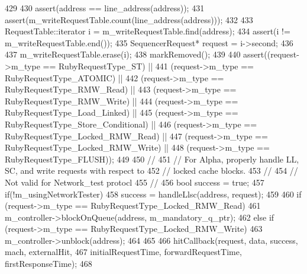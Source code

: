 \begin{DoxyCode}
429 {
430     assert(address == line_address(address));
431     assert(m_writeRequestTable.count(line_address(address)));
432 
433     RequestTable::iterator i = m_writeRequestTable.find(address);
434     assert(i != m_writeRequestTable.end());
435     SequencerRequest* request = i->second;
436 
437     m_writeRequestTable.erase(i);
438     markRemoved();
439 
440     assert((request->m_type == RubyRequestType_ST) ||
441            (request->m_type == RubyRequestType_ATOMIC) ||
442            (request->m_type == RubyRequestType_RMW_Read) ||
443            (request->m_type == RubyRequestType_RMW_Write) ||
444            (request->m_type == RubyRequestType_Load_Linked) ||
445            (request->m_type == RubyRequestType_Store_Conditional) ||
446            (request->m_type == RubyRequestType_Locked_RMW_Read) ||
447            (request->m_type == RubyRequestType_Locked_RMW_Write) ||
448            (request->m_type == RubyRequestType_FLUSH));
449 
450     //
451     // For Alpha, properly handle LL, SC, and write requests with respect to
452     // locked cache blocks.
453     //
454     // Not valid for Network_test protocl
455     //
456     bool success = true;
457     if(!m_usingNetworkTester)
458         success = handleLlsc(address, request);
459 
460     if (request->m_type == RubyRequestType_Locked_RMW_Read) {
461         m_controller->blockOnQueue(address, m_mandatory_q_ptr);
462     } else if (request->m_type == RubyRequestType_Locked_RMW_Write) {
463         m_controller->unblock(address);
464     }
465 
466     hitCallback(request, data, success, mach, externalHit,
467                 initialRequestTime, forwardRequestTime, firstResponseTime);
468 }
\end{DoxyCode}


